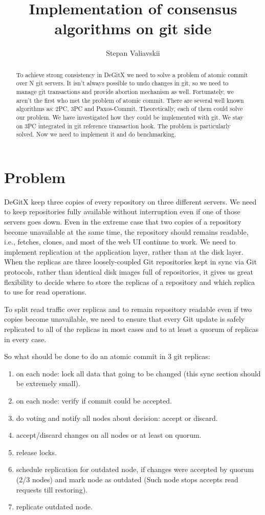 \documentclass[acmlarge, screen, nonacm]{acmart}
\title{Implementation of consensus algorithms on git side}
\author{Stepan Valiavskii}
\begin{document}
\begin{abstract}
To achieve strong consistency in DeGitX we need to solve a problem of atomic commit over N git servers.
It isn't always possible to undo changes in git, so we need to manage git transactions and provide abortion mechanism as well.
Fortunately, we aren't the first who met the problem of atomic commit.
There are several well known algorithms as: 2PC, 3PC and Paxos-Commit.
Theoretically, each of them could solve our problem.
We have investigated how they could be implemented with git.
We stay on 3PC integrated in git reference transaction hook.
The problem is particularly solved.
Now we need to implement it and do benchmarking.
\end{abstract}

\maketitle

\section{Problem}

DeGitX keep three copies of every repository on three different servers.
We need to keep repositories fully
available without interruption even if one of those servers goes down.
Even in the extreme case that two copies of a repository become unavailable at
the same time, the repository should remains readable, i.e., fetches, clones, and
most of the web UI continue to work.
We need to implement replication at the application layer, rather than at the disk layer.
When the replicas are three loosely-coupled Git repositories kept
in sync via Git protocols, rather than identical disk images full of repositories,
it gives us great flexibility to decide where to
store the replicas of a repository and which replica to use for read operations.

To split read traffic over replicas and to remain repository readable even if two copies become unavailable,
we need to ensure that every Git update is safely replicated to all of the replicas in most cases
and to at least a quorum of replicas in every case.

So what should be done to do an atomic commit in 3 git replicas:
\begin{enumerate}
  \item on each node: lock all data that going to be changed (this sync section should be extremely small).
  \item on each node: verify if commit could be accepted.
  \item do voting and notify all nodes about decision: accept or discard.
  \item accept/discard changes on all nodes or at least on quorum.
  \item release locks.
  \item schedule replication for outdated node, if changes were accepted by quorum (2/3 nodes) and mark node as outdated (Such node stops accepts read requests till restoring).
  \item replicate outdated node.
\end{enumerate}
\end{document}
